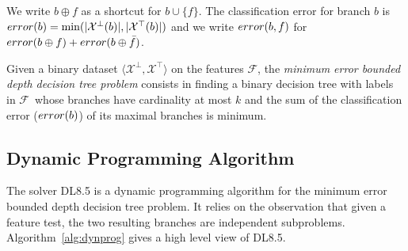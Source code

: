 \documentclass{llncs}
\newcommand{\tru}[0]{\texttt{true}}
\newcommand{\setex}[1]{\ensuremath{{\mathcal X}^{#1}}\xspace}
\newcommand{\posex}{{\setex{\top}}\xspace}
\newcommand{\negex}{{\setex{\bot}}\xspace}
\newcommand{\features}{\ensuremath{{\mathcal F}}\xspace}
\newcommand{\maxd}[0]{\ensuremath{k}}
\newcommand{\afeat}[0]{\ensuremath{f}}
\newcommand{\best}[1][]{\ensuremath{\ifthenelse{\equal{#1}{}}{{best}}{{best({#1})}}}}
\newcommand{\error}[1][]{\ensuremath{\ifthenelse{\equal{#1}{}}{{error}}{{error({{#1}})}}}}
\newcommand{\classlabel}[1][]{\ensuremath{\ifthenelse{\equal{#1}{}}{{y}}{{y({{#1}})}}}}
\newcommand{\abranch}[0]{\ensuremath{b}}
\newcommand{\mdepth}[0]{\ensuremath{k}}
\newcommand{\grow}[2]{\ensuremath{{#1}\oplus{#2}}}
\begin{document}
We write $\grow{\abranch}{\afeat}$ as a shortcut for $\abranch \cup \{\afeat\}$.
The classification error for branch $\abranch$ is $\error[\abranch]=\min(|\negex(\abranch)|, |\posex(\abranch)|)$
and we write $\error[\abranch,\afeat]$ for $\error[\grow{\abranch}{\afeat}] + \error[\grow{\abranch}{\bar{\afeat}}]$.

\medskip

Given a binary dataset $\langle \negex,\posex \rangle$ on the features \features, %
the \emph{minimum error bounded depth decision tree problem} consists in finding a binary decision tree with labels in \features\ whose branches have cardinality at most $\mdepth$ and the sum of the classification error ($\error[\abranch]$) of its maximal branches is minimum.


\subsection{Dynamic Programming Algorithm}

The solver DL8.5 is a dynamic programming algorithm for the minimum error bounded depth decision tree problem. It relies on the observation that given a feature test, the two resulting branches are independent subproblems. Algorithm~\ref{alg:dynprog} gives a high level view of DL8.5.


	
\end{document}
